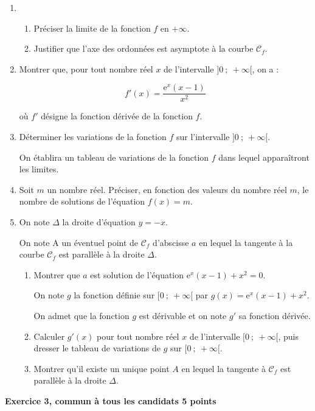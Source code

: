 \documentclass[10pt,a4paper,french]{article}
\begin{document}
\begin{enumerate}
\item 
	\begin{enumerate}
		\item Préciser la limite de la fonction $f$ en $+ \infty$.
		\item Justifier que l'axe des ordonnées est asymptote à la courbe $\mathcal{C}_f$.
	\end{enumerate}
\item  Montrer que, pour tout nombre réel $x$ de l'intervalle $]0~;~ +\infty[$, on a :

\[f'(x) = \dfrac{\text{e}^x(x - 1)}{x^2}\]

où $f'$ désigne la fonction dérivée de la fonction $f$.
\item Déterminer les variations de la fonction $f$ sur l'intervalle $]0~;~ +\infty[$. 

On établira un tableau de variations de la fonction $f$ dans lequel apparaîtront les limites. 
\item Soit $m$ un nombre réel. Préciser, en fonction des valeurs du nombre réel $m$, le nombre de solutions de l'équation $f(x) = m$.
\item  On note $\Delta$ la droite d'équation $y = -x$.

On note A un éventuel point de $\mathcal{C}_f$ d'abscisse $a$ en lequel la tangente à la courbe $\mathcal{C}_f$ est parallèle à la droite $\Delta$.
	\begin{enumerate}
		\item Montrer que $a$ est solution de l'équation $\text{e}^x(x - 1) + x^2  = 0$.
	
On note $g$ la fonction définie sur $[0~;~ +\infty[$ par $g(x) = \text{e}^x(x - 1) + x^2 $.

On admet que la fonction $g$ est dérivable et on note $g'$ sa fonction dérivée.
		\item Calculer $g'(x)$ pour tout nombre réel $x$ de l'intervalle $[0~;~ +\infty[$, puis dresser le tableau de variations de $g$ sur $[0~;~+\infty[$.
		\item Montrer qu'il existe un unique point $A$ en lequel la tangente à $\mathcal{C}_f$ est parallèle à la droite $\Delta$.
	\end{enumerate}
\end{enumerate}

\bigskip

\textbf{Exercice 3, commun à tous les candidats \hfill 5 points}

\medskip
\end{document}
